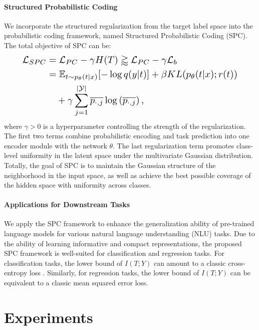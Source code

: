 \documentclass[letterpaper]{article} %
\begin{document}
\paragraph{Structured Probabilistic Coding}
We incorporate the structured regularization from the target label space into the probabilistic coding framework, named Structured Probabilistic Coding (SPC).
The total objective of SPC can be:
\begin{equation}
\resizebox{0.89\linewidth}{!}{$
\begin{split}
\mathcal{L}_{SPC}
&= \mathcal{L}_{PC} - \gamma  H(T)
 \gtrapprox \mathcal{L}_{PC} - \gamma  \mathcal{L}_b\\
&= \mathbb{E}_{t \sim p_{\theta}(t|x)} [-\log q(y|t)]
     + \beta  KL(p_{\theta}(t|x); r(t)) \\
     & \quad   + \gamma  \sum_{j=1}^{|\mathcal { Y } | } \overline { p_ { \cdot ,j } } \log \left ( \overline { p_ { \cdot ,j } } \right ) ,
\end{split}
$}
\end{equation}
where $\gamma >0$ is a hyperparameter controlling the strength of the regularization.
The first two terms combine probabilistic encoding and task prediction into one encoder module with the network $\theta$.
The last regularization term promotes class-level uniformity in the latent space under the multivariate Gaussian distribution.
Totally, the goal of SPC is to maintain the Gaussian structure of the neighborhood in the input space, as well as achieve the best possible coverage of the hidden space with uniformity across classes.



\paragraph{Applications for Downstream Tasks}
We apply the SPC framework to enhance the generalization ability of pre-trained language models for various natural language understanding (NLU) tasks.
Due to the ability of learning informative and compact representations, the proposed SPC framework is well-suited for classification and regression tasks.
For classification tasks, the lower bound of $I(T;Y)$ can amount to a classic cross-entropy loss \cite{achille2018information,amjad2019learning}.
Similarly, for regression tasks, the lower bound of $I(T;Y)$ can be equivalent to a classic mean squared error loss.


\section{Experiments}
\end{document}
